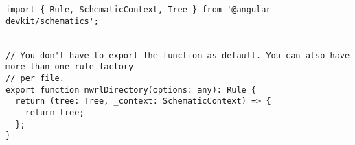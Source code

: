\begin{lstlisting}
import { Rule, SchematicContext, Tree } from '@angular-devkit/schematics';


// You don't have to export the function as default. You can also have more than one rule factory
// per file.
export function nwrlDirectory(options: any): Rule {
  return (tree: Tree, _context: SchematicContext) => {
    return tree;
  };
}
\end{lstlisting}

